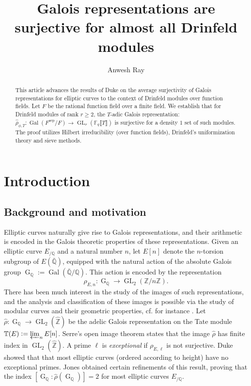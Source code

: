 \documentclass[11pt]{amsart}
\newcommand{\Z}{\mathbb{Z}}
\newcommand{\Q}{\mathbb{Q}}
\newcommand{\F}{\mathbb{F}}
\newcommand{\op}[1]{\operatorname{#1}}
\numberwithin{equation}{section}
\begin{document}
\title[Galois surjectivity for most Drinfeld modules]{Galois representations are surjective for almost all Drinfeld modules}


\author[A.~Ray]{Anwesh Ray}
\address[Ray]{Chennai Mathematical Institute, H1, SIPCOT IT Park, Kelambakkam, Siruseri, Tamil Nadu 603103, India}




\maketitle

\begin{abstract}
This article advances the results of Duke on the average surjectivity of Galois representations for elliptic curves to the context of Drinfeld modules over function fields. Let $F$ be the rational function field over a finite field. We establish that for Drinfeld modules of rank $r \geq 2$, the $T$-adic Galois representation:
$\hat{\rho}_{\phi, T}: \op{Gal}(F^{\op{sep}}/F) \rightarrow \op{GL}_r(\F_q\llbracket T\rrbracket)$ is surjective for a density $1$ set of such modules. The proof utilizes Hilbert irreducibility (over function fields), Drinfeld's uniformization theory and sieve methods.
\end{abstract}

\section{Introduction}
\subsection{Background and motivation} Elliptic curves naturally give rise to Galois representations, and their arithmetic is encoded in the Galois theoretic properties of these representations. Given an elliptic curve $E_{/\Q}$ and a natural number $n$, let $E[n]$ denote the $n$-torsion subgroup of $E(\bar{\Q})$, equipped with the natural action of the absolute Galois group $\op{G}_{\Q}:=\op{Gal}(\bar{\Q}/\Q)$. This action is encoded by the representation 
\[\rho_{E, n}: \op{G}_{\Q}\rightarrow \op{GL}_2(\Z/n\Z).\] There has been much interest in the study of the images of such representations, and the analysis and classification of these images is possible via the study of modular curves and their geometric properties, cf. for instance \cite{Mazurmodcurves,Sutherland, zywina}. Let $\hat{\rho}:\op{G}_{\Q}\rightarrow \op{GL}_2(\widehat{\Z})$ be the adelic Galois representation on the Tate module $\mathbb{T}(E):=\varprojlim_n E[n]$. Serre's open image theorem states that the image $\hat{\rho}$ has finite index in $\op{GL}_2(\widehat{\Z})$. A prime $\ell$ is \emph{exceptional} if $\rho_{E, \ell}$ is not surjective. Duke \cite{duke1997elliptic} showed that that most elliptic curves (ordered according to height) have no exceptional primes. Jones \cite{Jones} obtained certain refinements of this result, proving that the index $[\op{G}_{\Q}:\hat{\rho}(\op{G}_{\Q})]=2$ for most elliptic curves $E_{/\Q}$. 
\end{document}
